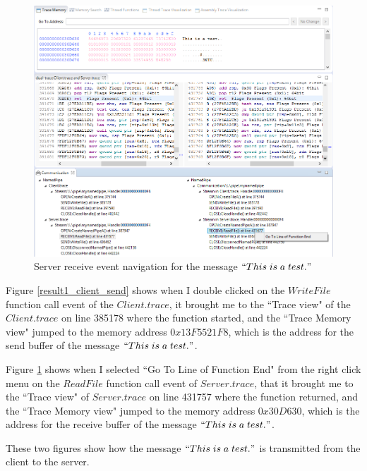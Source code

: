 \begin{figure}
\includegraphics[width=\textwidth]{Figures/result1_server_read}
 \caption{Server receive event navigation for the message $``This\; is\; a\; test."$}
\label{result1_server_read}
\end{figure}

Figure \ref{result1_client_send} shows when I double clicked on the $WriteFile$ function call event of the $Client.trace$, it brought me to the ``Trace view" of the $Client.trace$ on line 385178 where the function started, and the ``Trace Memory view" jumped to the memory address $0x13F5521F8$, which is the address for the send buffer of the message $``This\; is\; a\; test."$.

Figure \ref{result1_server_read} shows when I selected ``Go To Line of Function End" from the right click menu on the $ReadFile$ function call event of $Server.trace$, that it brought me to the ``Trace view" of $Server.trace$ on line 431757 where the function returned, and the ``Trace Memory view" jumped to the memory address $0x30D630$, which is the address for the receive buffer of the message $``This\; is\; a\; test."$.

These two figures show how the message $``This\; is\; a\; test."$ is transmitted from the client to the server.

